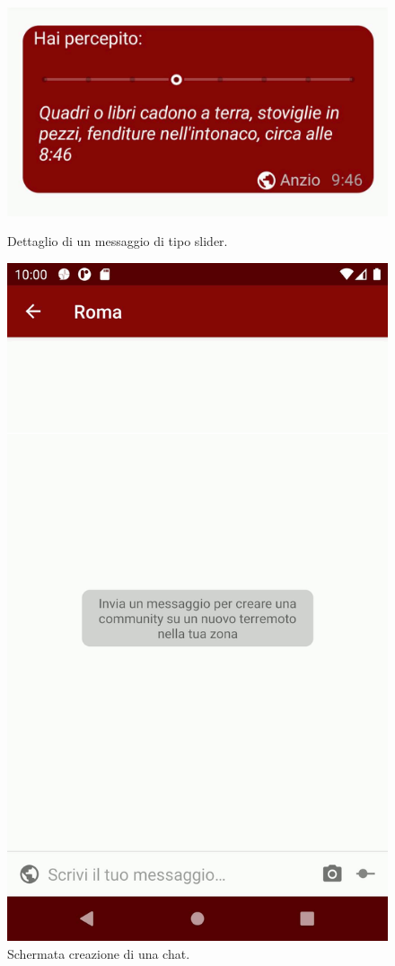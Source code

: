\begin{figure}[p]
\centering

\begin{minipage}{0.45\linewidth}
\centering
\includegraphics[width=0.85\linewidth]{assets/02/slider.png}
\caption{Dettaglio di un messaggio di tipo slider.}
\label{fig:android_slider}
\end{minipage}\hfill
\begin{minipage}{0.45\linewidth}
\centering
\includegraphics[width=0.85\linewidth]{assets/02/nuova_chat.png}
\caption{Schermata creazione di una chat.}
\label{fig:android_creazione}
\end{minipage}

\end{figure}

